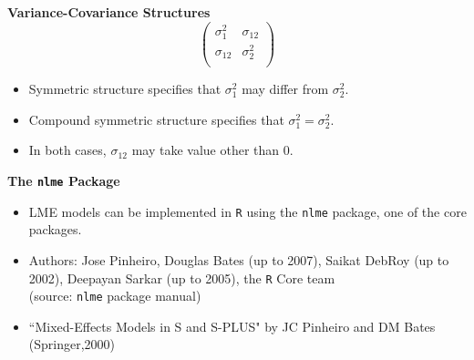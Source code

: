 \documentclass[compress]{beamer}        %
\makeatletter
\newcommand{\tcb}{\textcolor{beamer@blendedblue}}
\makeatother
\begin{document}
		\begin{frame}{\bf \tcb{Variance-Covariance Structures}}
			\large
			\[\left(
			\begin{array}{cc}
			\sigma^2_1 & \sigma_{12}\\
			\sigma_{12} & \sigma^2_2\\
			\end{array} \right)
			\]
			
			\begin{itemize}
				\item Symmetric structure specifies that $\sigma^2_1$ may differ from $\sigma^2_2$.
				\item Compound symmetric structure specifies that $\sigma^2_1 = \sigma^2_2$.
				\item In both cases, $\sigma_{12}$ may take value other than 0.
			\end{itemize}
			
		\end{frame}
		\begin{frame}{\bf \tcb{The \texttt{nlme} Package}}
			
			\begin{itemize}
				\item LME models can be implemented in \texttt{R} using the \texttt{nlme} package, one of the core packages.\\
				\item Authors: Jose Pinheiro, Douglas Bates (up to 2007), Saikat
				DebRoy (up to 2002), Deepayan Sarkar (up to 2005), the \texttt{R} Core team \\(source: \texttt{nlme} package manual)\\
				\item ``Mixed-Effects Models in S and S-PLUS" by JC Pinheiro and DM Bates (Springer,2000)
				
			\end{itemize}
			
		\end{frame}
\end{document}
